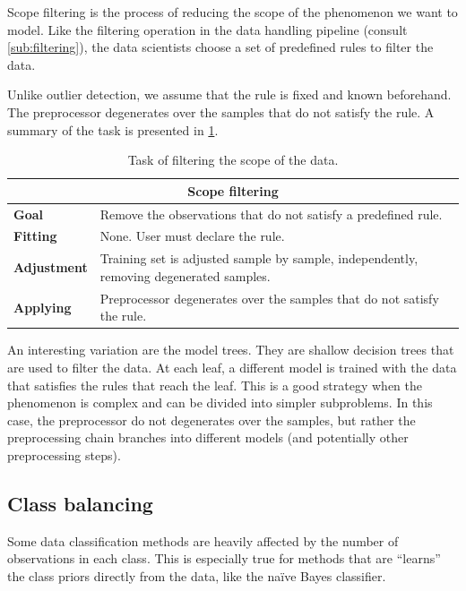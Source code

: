 Scope filtering is the process of reducing the scope of the phenomenon we want to model.
Like the filtering operation in the data handling pipeline (consult \cref{sub:filtering}),
the data scientists choose a set of predefined rules to filter the data.

Unlike outlier detection, we assume that the rule is fixed and known beforehand.  The
preprocessor degenerates over the samples that do not satisfy the rule.  A summary of the
task is presented in \cref{tab:scope-filtering}.

\begin{table}\caption{Task of filtering the scope of the data.}
  \centering
  \begin{tabular}{lp{6cm}}
    \toprule
    \multicolumn{2}{c}{\textbf{Scope filtering}} \\
    \midrule
    \textbf{Goal} &
      Remove the observations that do not satisfy a predefined rule. \\
    \textbf{Fitting} &
      None. User must declare the rule. \\
    \textbf{Adjustment} &
      Training set is adjusted sample by sample, independently, removing degenerated
      samples. \\
    \textbf{Applying} &
      Preprocessor degenerates over the samples that do not satisfy the rule. \\
    \bottomrule
  \end{tabular}
  \label{tab:scope-filtering}
\end{table}

An interesting variation are the model trees.  They are shallow
decision trees that are used to filter the data.  At each leaf, a different model is
trained with the data that satisfies the rules that reach the leaf.  This is a good
strategy when the phenomenon is complex and can be divided into simpler subproblems.
In this case, the preprocessor do not degenerates over the samples, but rather the
preprocessing chain branches into different models (and potentially other preprocessing
steps).

\subsection{Class balancing}

Some data classification methods are heavily affected by the number of observations in each
class.  This is especially true for methods that are ``learns'' the class priors directly
from the data, like the naïve Bayes classifier.

